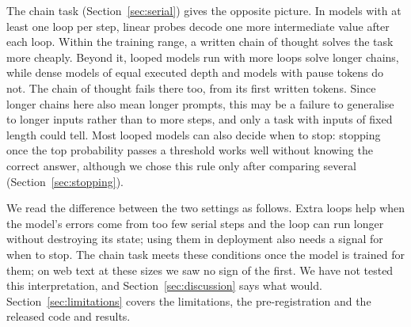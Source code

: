 The chain task (Section~\ref{sec:serial}) gives the opposite picture. In models with at least one loop per step, linear
probes decode one more intermediate value after each loop. Within the training range, a written chain of thought solves
the task more cheaply. Beyond it, looped models run with more loops solve longer chains, while dense models of equal executed depth and models
with pause tokens do not. The chain of thought fails there too, from its first written tokens. Since longer chains here
also mean longer prompts, this may be a failure to generalise to longer inputs rather than to more steps, and only a task
with inputs of fixed length could tell. Most looped
models can also decide when to stop: stopping once the top probability passes a threshold works well without knowing the correct
answer, although we chose this rule only after comparing several (Section~\ref{sec:stopping}).

We read the difference between the two settings as follows. Extra loops help when the model's errors come from too few
serial steps and the loop can run longer without destroying its state; using them in deployment also needs a signal
for when to stop. The chain task meets these conditions once the model is trained for them; on web text at these sizes we saw no
sign of the first. We have not tested this interpretation, and Section~\ref{sec:discussion} says what would.
Section~\ref{sec:limitations} covers the limitations, the pre-registration and the released code and results.
